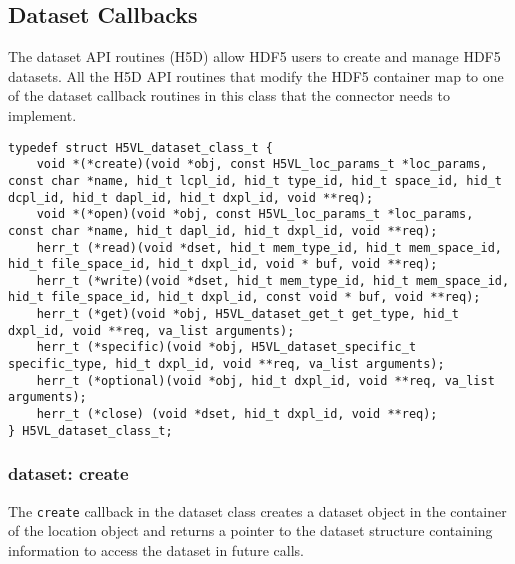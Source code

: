 
\subsection{Dataset Callbacks}
The dataset API routines (H5D) allow HDF5 users to create and manage
HDF5 datasets. All the H5D API routines that modify the HDF5 container
map to one of the dataset callback routines in this class that the
connector needs to implement.

\begin{lstlisting}[caption={Structure for dataset callback routines, H5VLconnector.h}, captionpos=b, label={lst:DSclass}]
typedef struct H5VL_dataset_class_t {                                            
    void *(*create)(void *obj, const H5VL_loc_params_t *loc_params, const char *name, hid_t lcpl_id, hid_t type_id, hid_t space_id, hid_t dcpl_id, hid_t dapl_id, hid_t dxpl_id, void **req);
    void *(*open)(void *obj, const H5VL_loc_params_t *loc_params, const char *name, hid_t dapl_id, hid_t dxpl_id, void **req);
    herr_t (*read)(void *dset, hid_t mem_type_id, hid_t mem_space_id, hid_t file_space_id, hid_t dxpl_id, void * buf, void **req);
    herr_t (*write)(void *dset, hid_t mem_type_id, hid_t mem_space_id, hid_t file_space_id, hid_t dxpl_id, const void * buf, void **req);
    herr_t (*get)(void *obj, H5VL_dataset_get_t get_type, hid_t dxpl_id, void **req, va_list arguments);
    herr_t (*specific)(void *obj, H5VL_dataset_specific_t specific_type, hid_t dxpl_id, void **req, va_list arguments);
    herr_t (*optional)(void *obj, hid_t dxpl_id, void **req, va_list arguments);
    herr_t (*close) (void *dset, hid_t dxpl_id, void **req);
} H5VL_dataset_class_t; 
\end{lstlisting}

\subsubsection{dataset: create}
The \texttt{create} callback in the dataset class creates a dataset
object in the container of the location object and returns a pointer
to the dataset structure containing information to access the dataset
in future calls.\bigskip

